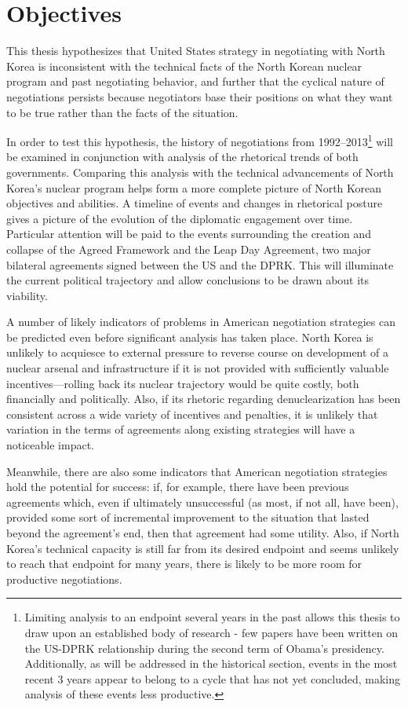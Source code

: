 \section*{Objectives}

This thesis hypothesizes that United States strategy in negotiating with North Korea is inconsistent with the technical facts of the North Korean nuclear program and past negotiating behavior, and further that the cyclical nature of negotiations persists because negotiators base their positions on what they want to be true rather than the facts of the situation. 

In order to test this hypothesis, the history of negotiations from 1992--2013\footnote{Limiting analysis to an endpoint several years in the past allows this thesis to draw upon an established body of research - few papers have been written on the US-DPRK relationship during the second term of Obama's presidency. Additionally, as will be addressed in the historical section, events in the most recent 3 years appear to belong to a cycle that has not yet concluded, making analysis of these events less productive.} will be examined in conjunction with analysis of the rhetorical trends of both governments. Comparing this analysis with the technical advancements of North Korea's nuclear program helps form a more complete picture of North Korean objectives and abilities. A timeline of events and changes in rhetorical posture gives a picture of the evolution of the diplomatic engagement over time. Particular attention will be paid to the events surrounding the creation and collapse of the Agreed Framework and the Leap Day Agreement, two major bilateral agreements signed between the US and the DPRK. This will illuminate the current political trajectory and allow conclusions to be drawn about its viability.

A number of likely indicators of problems in American negotiation strategies can be predicted even before significant analysis has taken place. North Korea is unlikely to acquiesce to external pressure to reverse course on development of a nuclear arsenal and infrastructure if it is not provided with sufficiently valuable incentives---rolling back its nuclear trajectory would be quite costly, both financially and politically. Also, if its rhetoric regarding denuclearization has been consistent across a wide variety of incentives and penalties, it is unlikely that variation in the terms of agreements along existing strategies will have a noticeable impact.

Meanwhile, there are also some indicators that American negotiation strategies hold the potential for success: if, for example, there have been previous agreements which, even if ultimately unsuccessful (as most, if not all, have been), provided some sort of incremental improvement to the situation that lasted beyond the agreement's end, then that agreement had some utility. Also, if North Korea's technical capacity is still far from its desired endpoint and seems unlikely to reach that endpoint for many years, there is likely to be more room for productive negotiations.



